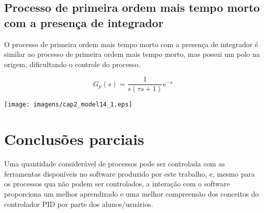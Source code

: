 \subsection{Processo de primeira ordem mais tempo morto com a presença de integrador}
    
    O processo de primeira ordem mais tempo morto com a presença de integrador é
    similar ao processo de primeira ordem mais tempo morto, mas possui um polo
    na origem, dificultando o controle do processo.
    
    \begin{equation}
        G_p(s) = \frac{1}{s(\tau s + 1)}e^{-s}
    \end{equation}
    
    \begin{center}
        \texttt{[image: imagens/cap2\_model14\_1.eps]}
    \end{center}

\section{Conclusões parciais}

    Uma quantidade considerável de processos pode ser controlada com as ferramentas
    disponíveis no software produzido por este trabalho, e, mesmo para os processos
    qua não podem ser controlados, a interação com o software proporciona um melhor
    aprendizado e uma melhor compreensão dos conceitos do controlador \ac{PID}
    por parte dos alunos/usuários.
